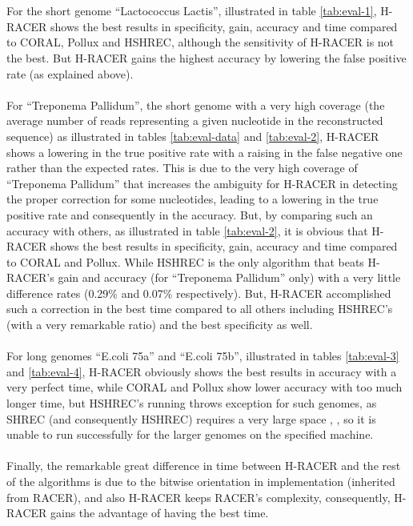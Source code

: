 \documentclass[12pt]{llncs}
\begin{document}
\\\\
For the short genome \enquote{Lactococcus Lactis}, illustrated in table \ref{tab:eval-1}, H-RACER shows the best results in specificity, gain, accuracy and time compared to CORAL, Pollux and HSHREC, although the sensitivity of H-RACER is not the best. But H-RACER gains the highest accuracy by lowering the false positive rate (as explained above).
\\\\ 
For \enquote{Treponema Pallidum}, the short genome with a very high coverage (the average number of reads representing a given nucleotide in the reconstructed sequence) as illustrated in tables \ref{tab:eval-data} and \ref{tab:eval-2}, H-RACER shows a lowering in the true positive rate with a raising in the false negative one rather than the expected rates. This is due to the very high coverage of \enquote{Treponema Pallidum} that increases the ambiguity for H-RACER in detecting the proper correction for some nucleotides, leading to a lowering in the true positive rate and consequently in the accuracy. But, by comparing such an accuracy with others, as illustrated in table \ref{tab:eval-2}, it is obvious that H-RACER shows the best results in specificity, gain, accuracy and time compared to CORAL and Pollux. While HSHREC is the only algorithm that beats H-RACER's gain and accuracy (for \enquote{Treponema Pallidum} only) with a very little difference rates (0.29\% and 0.07\% respectively). But, H-RACER accomplished such a correction in the best time compared to all others including HSHREC's (with a very remarkable ratio) and the best specificity as well.
\\\\
For long genomes \enquote{E.coli 75a} and \enquote{E.coli 75b}, illustrated in tables \ref{tab:eval-3} and \ref{tab:eval-4}, H-RACER obviously shows the best results in accuracy with a very perfect time, while CORAL and Pollux show lower accuracy with too much longer time, but HSHREC's running throws exception for such genomes, as SHREC (and consequently HSHREC) requires a very large space \cite{Racer}, \cite{HShrec}, so it is unable to run successfully for the larger genomes on the specified machine.
\\\\ 
Finally, the remarkable great difference in time between H-RACER and the rest of the algorithms is due to the bitwise orientation in implementation (inherited from RACER), and also H-RACER keeps RACER's complexity, consequently, H-RACER gains the advantage of having the best time. 
\end{document}
